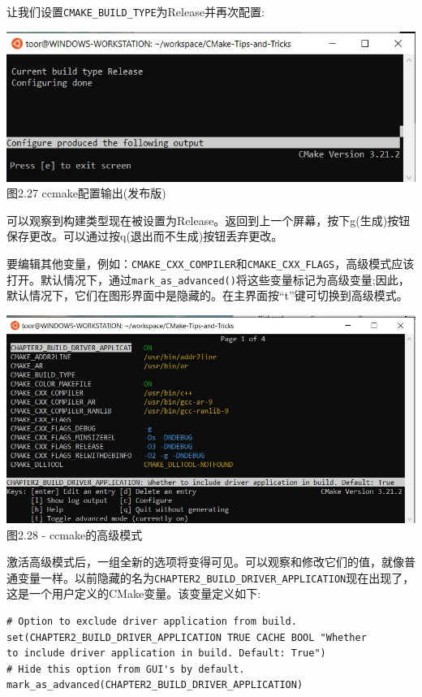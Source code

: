 让我们设置\texttt{CMAKE\_BUILD\_TYPE}为Release并再次配置:

\begin{center}
\includegraphics[width=1.\textwidth]{content/1/chapter2/images/27.jpg}\\
图2.27 ccmake配置输出(发布版)
\end{center}

可以观察到构建类型现在被设置为Release。返回到上一个屏幕，按下g(生成)按钮保存更改。可以通过按q(退出而不生成)按钮丢弃更改。

要编辑其他变量，例如：\texttt{CMAKE\_CXX\_COMPILER}和\texttt{CMAKE\_CXX\_FLAGS}，高级模式应该打开。默认情况下，通过\texttt{mark\_as\_advanced()}将这些变量标记为高级变量;因此，默认情况下，它们在图形界面中是隐藏的。在主界面按“t”键可切换到高级模式。

\begin{center}
\includegraphics[width=1.\textwidth]{content/1/chapter2/images/28.jpg}\\
图2.28 - ccmake的高级模式
\end{center}

激活高级模式后，一组全新的选项将变得可见。可以观察和修改它们的值，就像普通变量一样。以前隐藏的名为\texttt{CHAPTER2\_BUILD\_DRIVER\_APPLICATION}现在出现了，这是一个用户定义的CMake变量。该变量定义如下:

\begin{lstlisting}[style=styleCMake]
# Option to exclude driver application from build.
set(CHAPTER2_BUILD_DRIVER_APPLICATION TRUE CACHE BOOL "Whether
to include driver application in build. Default: True")
# Hide this option from GUI's by default.
mark_as_advanced(CHAPTER2_BUILD_DRIVER_APPLICATION)
\end{lstlisting}

